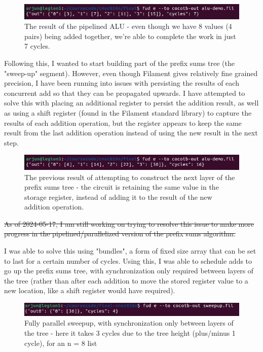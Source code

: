 \documentclass[12pt]{article}
\begin{document}
\begin{figure}[H]
    \centering
    \includegraphics[width=\linewidth]{images/alu_result.png}
    \caption{The result of the pipelined ALU - even though we have 8 values (4 pairs) being added together, we're able to complete the
    work in just 7 cycles.}
\end{figure}

Following this, I wanted to start building part of the prefix sums tree (the "sweep-up" segment). However, even though Filament gives
relatively fine grained precision, I have been running into issues with persisting the results of each concurrent add so that they can be
propagated upwards. I have attempted to solve this with placing an additional register to persist the addition result, as well as using a
shift register (found in the Filament standard library) to capture the results of each addition operation, but the register appears to keep the
same result from the last addition operation instead of using the new result in the next step.

\begin{figure}[H]
    \centering
    \includegraphics[width=\linewidth]{images/alu_result_doubled.png}
    \caption{The previous result of attempting to construct the next layer of the prefix sums tree - the circuit is retaining the same value in
    the storage register, instead of adding it to the result of the new addition operation.}
\end{figure}

\sout{As of 2024-05-17, I am still working on trying to resolve this issue to make more progress in the pipelined/parallelized version of
the prefix sums algorithm.}

I was able to solve this using "bundles", a form of fixed size array that can be set to last for a certain number of cycles. Using this,
I was able to schedule adds to go up the prefix sums tree, with synchronization only required between layers of the tree (rather than after each addition
to move the stored register value to a new location, like a shift register would have required).

\begin{figure}[H]
    \centering
    \includegraphics[width=\linewidth]{images/parallel_sweepup.png}
    \caption{Fully parallel sweepup, with synchronization only between layers of the tree - here it takes 3 cycles due to the tree height (plus/minus 1 cycle), for an n = 8 list}
\end{figure}
\end{document}
